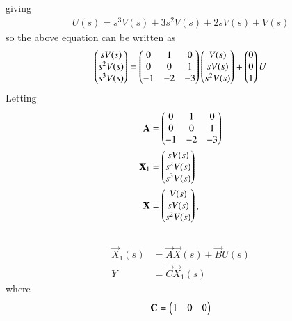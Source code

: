 \begin{enumerate}[label=\thesection.\arabic*.,ref=\thesection.\theenumi]
giving
\begin{align}
U(s)= s^3 V(s) + 3s^2 V(s)+2sV(s) + V(s)
\end{align}
%
so the above equation  can be written as
\begin{align}
\begin{pmatrix}sV(s)\\s^2V(s)\\s^3V(s)\end{pmatrix}
=
\begin{pmatrix}0&1&0\\0&0&1\\-1&-2&-3\end{pmatrix}\begin{pmatrix}V(s)\\sV(s)\\s^2V(s)\end{pmatrix}
+
\begin{pmatrix}0\\0\\1\end{pmatrix}  U
\end{align}
Letting
\begin{align}
\mathbf{A}&=\begin{pmatrix}0&1&0\\0&0&1\\-1&-2&-3\end{pmatrix}
\\
\mathbf{X}_1 &= \begin{pmatrix}sV(s)\\s^2V(s)\\s^3V(s)\end{pmatrix}
\\
\mathbf{X} &= \begin{pmatrix}V(s)\\sV(s)\\s^2V(s)\end{pmatrix},
\end{align}
\\
\begin{align}
\vec{X}_{1}(s) &= \vec{A}\vec{X}(s)+ \vec{B}U(s)
\\
Y&=\vec{C}\vec{X}_{1}(s)
\end{align}
where
\begin{align}
\mathbf{C}=\begin{pmatrix}1&0&0\end{pmatrix}
\end{align}


\end{enumerate}
